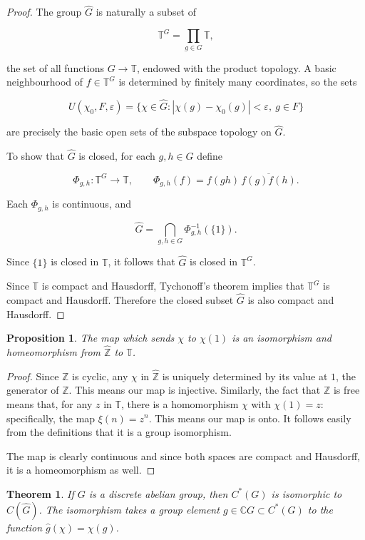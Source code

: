 \documentclass{book}
\newtheorem{proposition}[definition]{Proposition}
\newtheorem{theorem}[definition]{Theorem}
\begin{document}
\begin{proof}
  The group $\widehat G$ is naturally a subset of

  \[
  \mathbb T^G=\prod_{g\in G}\mathbb T,
  \]

  the set of all functions $G\to\mathbb T$, endowed with the product
  topology. A basic neighbourhood of $f\in\mathbb T^G$ is determined by
  finitely many coordinates, so the sets

  \[
  U(\chi_0,F,\varepsilon)
  =
  \{\chi\in\widehat G:
  |\chi(g)-\chi_0(g)|<\varepsilon,\ g\in F\}
  \]

  are precisely the basic open sets of the subspace topology on
  $\widehat G$.

  To show that $\widehat G$ is closed, for each $g,h\in G$ define

  \[
  \Phi_{g,h}:\mathbb T^G\to\mathbb T,
  \qquad
  \Phi_{g,h}(f)=f(gh)\,\overline{f(g)f(h)}.
  \]

  Each $\Phi_{g,h}$ is continuous, and

  \[
  \widehat G
  =
  \bigcap_{g,h\in G}
  \Phi_{g,h}^{-1}(\{1\}).
  \]

  Since $\{1\}$ is closed in $\mathbb T$, it follows that $\widehat G$ is
  closed in $\mathbb T^G$.

  Since $\mathbb T$ is compact and Hausdorff, Tychonoff's theorem implies
  that $\mathbb T^G$ is compact and Hausdorff. Therefore the closed subset
  $\widehat G$ is also compact and Hausdorff.
\end{proof}
\begin{proposition}
  The map which sends \(\chi\) to \(\chi(1)\) is an isomorphism and
  homeomorphism from \(\hat{\mathbb{Z}}\) to \(\mathbb{T}\).
\end{proposition}
\begin{proof}
  Since \(\mathbb{Z}\) is cyclic, any \(\chi\) in \(\hat{\mathbb{Z}}\) is uniquely determined by its value at
  \(1\), the generator of \(\mathbb{Z}\). This means our map is injective. Similarly, the fact
  that \(\mathbb{Z}\) is free means that, for any \(z\) in \(\mathbb{T}\), there is a homomorphism \(\chi\) with
  \(\chi(1) = z\): specifically, the map \(\xi(n) = z^n\). This means our map is onto. It
  follows easily from the definitions that it is a group isomorphism.\par
  The map is clearly continuous and since both spaces are compact and
  Hausdorff, it is a homeomorphism as well.
\end{proof}
\begin{theorem}\label{theorem:255}
  If \(G\) is a discrete abelian group, then \(C^*(G)\) is isomorphic
  to \(C(\hat{G})\). The isomorphism takes a group element \(g \in \mathbb{C}G \subset C^*(G)\) to the
  function \(\hat{g}(\chi) = \chi(g)\).
\end{theorem}
\end{document}
